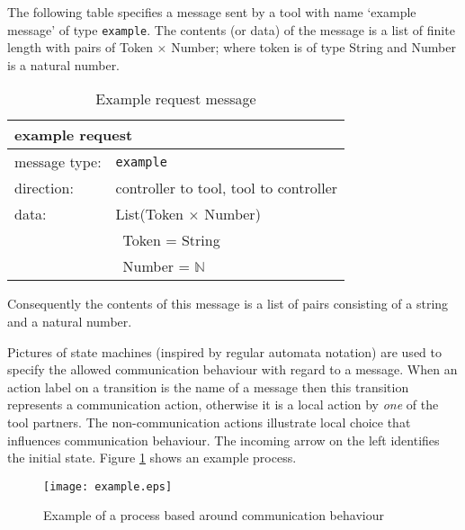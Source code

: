 \documentclass{article}
\newcommand{\msg}[1]{\texttt{#1}}
\begin{document}
   The following table specifies a message sent by a tool with name `example
   message' of type \msg{example}.  The contents (or data) of the message is a
   list of finite length with pairs of Token $\times$ Number; where token is of
   type String and Number is a natural number.

   \begin{table}[H]
    \begin{center}
     \begin{tabular}{|ll|}
      \hline
       \multicolumn{2}{|l|}{\textbf{example request}} \\
      \hline
       message type:    & \msg{example} \\
      \hline
       direction:       & controller to tool, tool to controller \\
       data:            & List(Token $\times$ Number) \\
                        & \ Token  = String \\
                        & \ Number = $\mathbb{N}$ \\
      \hline
     \end{tabular}
     \vspace{-0.3cm}
    \end{center}
    \caption{Example request message}
    \label{table:example_message}
   \end{table}
   \noindent Consequently the contents of this message is a list of pairs
   consisting of a string and a natural number.

   \noindent Pictures of state machines (inspired by regular automata notation)
   are used to specify the allowed communication behaviour with regard to a
   message. When an action label on a transition is the name of a message then
   this transition represents a communication action, otherwise it is a local
   action by \emph{one} of the tool partners. The non-communication actions
   illustrate local choice that influences communication behaviour. The
   incoming arrow on the left identifies the initial state. Figure
   \ref{fig:process_example} shows an example process.

   \begin{figure}[H]
    \begin{center}
     \texttt{[image: example.eps]}
    \end{center}
    \vspace{-0.3cm}
    \caption{Example of a process based around communication behaviour}
    \label{fig:process_example}
   \end{figure}
\end{document}
